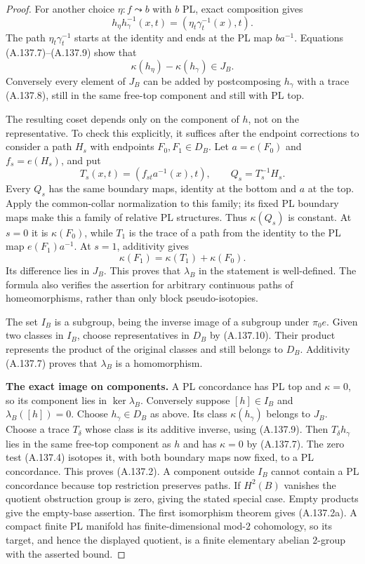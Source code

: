 \begin{proof}
For another choice $\eta:f\leadsto b$ with $b$ PL, exact composition
gives
\[
 h_\eta h_\gamma^{-1}(x,t)
           =(\eta_t\gamma_t^{-1}(x),t).                \tag{A.137.11}
\]
The path $\eta_t\gamma_t^{-1}$ starts at the identity and ends at
the PL map $ba^{-1}$. Equations (A.137.7)--(A.137.9) show that
\[
                 \kappa(h_\eta)-\kappa(h_\gamma)\in J_B.
                                                               \tag{A.137.12}
\]
Conversely every element of $J_B$ can be added by postcomposing
$h_\gamma$ with a trace (A.137.8), still in the same free-top
component and still with PL top.

The resulting coset depends only on the component of $h$, not on
the representative. To check this explicitly, it suffices after
the endpoint corrections to consider a path $H_s$ with endpoints
$F_0,F_1\in D_B$. Let $a=e(F_0)$ and $f_s=e(H_s)$, and put
\[
 T_s(x,t)=(f_{s t}a^{-1}(x),t),\qquad Q_s=T_s^{-1}H_s.
                                                               \tag{A.137.13}
\]
Every $Q_s$ has the same boundary maps, identity at the bottom and
$a$ at the top. Apply the common-collar normalization to this
family; its fixed PL boundary maps make this a family of relative
PL structures. Thus $\kappa(Q_s)$ is constant. At $s=0$ it is
$\kappa(F_0)$, while $T_1$ is the trace of a path from the identity
to the PL map $e(F_1)a^{-1}$. At $s=1$, additivity gives
\[
        \kappa(F_1)=\kappa(T_1)+\kappa(F_0).
\]
Its difference lies in $J_B$. This proves that $\lambda_B$ in the
statement is well-defined. The formula also verifies the assertion
for arbitrary continuous paths of homeomorphisms, rather than only
block pseudo-isotopies.

The set $I_B$ is a subgroup, being the inverse image of a subgroup
under $\pi_0e$. Given two classes in $I_B$, choose representatives
in $D_B$ by (A.137.10). Their product represents the product of the
original classes and still belongs to $D_B$. Additivity (A.137.7)
proves that $\lambda_B$ is a homomorphism.

\textbf{The exact image on components.}
A PL concordance has PL top and $\kappa=0$, so its component lies
in $\ker\lambda_B$. Conversely suppose $[h]\in I_B$ and
$\lambda_B([h])=0$. Choose $h_\gamma\in D_B$ as above.
Its class $\kappa(h_\gamma)$ belongs to $J_B$. Choose a trace
$T_\delta$ whose class is its additive inverse, using (A.137.9).
Then $T_\delta h_\gamma$ lies in the same free-top component as
$h$ and has $\kappa=0$ by (A.137.7). The zero test (A.137.4)
isotopes it, with both boundary maps now fixed, to a PL concordance.
This proves (A.137.2). A component outside $I_B$ cannot contain a
PL concordance because top restriction preserves paths. If $H^2(B)$
vanishes the quotient obstruction group is zero, giving the stated
special case. Empty products give the empty-base assertion.
The first isomorphism theorem gives (A.137.2a). A compact finite PL
manifold has finite-dimensional mod-$2$ cohomology, so its target,
and hence the displayed quotient, is a finite elementary abelian
$2$-group with the asserted bound.


\end{proof}
